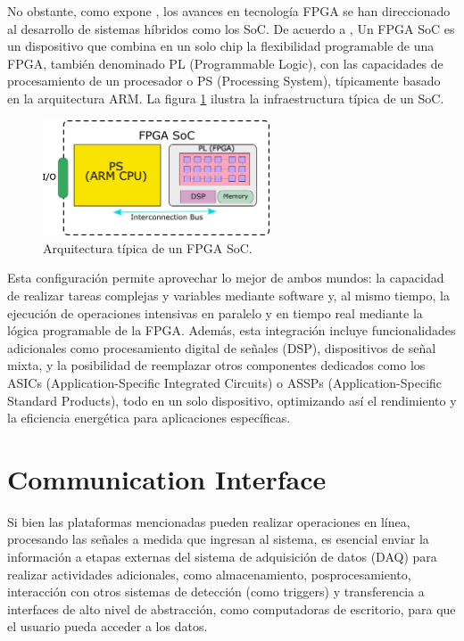\documentclass[]{book}
\begin{document}
\noindent No obstante, como expone \cite{bravo2020new}, los avances en tecnología FPGA se han direccionado al desarrollo de sistemas híbridos como los SoC. De acuerdo a \cite{amd_zynq_7000}, Un FPGA SoC es un dispositivo que combina en un solo chip la flexibilidad programable de una FPGA, también denominado PL (Programmable Logic), con las capacidades de procesamiento de un procesador o PS (Processing System), típicamente basado en la arquitectura ARM. La figura \ref{fig:fpga_soc} ilustra la infraestructura típica de un SoC. \\ 

\begin{figure}[h]
    \centering
    \includegraphics[width=0.6\textwidth]{FPGA_SoC.png}
    \caption{Arquitectura típica de un FPGA SoC.}
    \label{fig:fpga_soc}

\end{figure}

\noindent Esta configuración permite aprovechar lo mejor de ambos mundos: la capacidad de realizar tareas complejas y variables mediante software y, al mismo tiempo, la ejecución de operaciones intensivas en paralelo y en tiempo real mediante la lógica programable de la FPGA. Además, esta integración incluye funcionalidades adicionales como procesamiento digital de señales (DSP), dispositivos de señal mixta, y la posibilidad de reemplazar otros componentes dedicados como los ASICs (Application-Specific Integrated Circuits) o ASSPs (Application-Specific Standard Products), todo en un solo dispositivo, optimizando así el rendimiento y la eficiencia energética para aplicaciones específicas.\\

\section{Communication Interface}
\label{sec:communication_interface}

\noindent Si bien las plataformas mencionadas pueden realizar operaciones en línea, procesando las señales a medida que ingresan al sistema, es esencial enviar la información a etapas externas del sistema de adquisición de datos (DAQ) para realizar actividades adicionales, como almacenamiento, posprocesamiento, interacción con otros sistemas de detección (como triggers) y transferencia a interfaces de alto nivel de abstracción, como computadoras de escritorio, para que el usuario pueda acceder a los datos. \\
\end{document}
